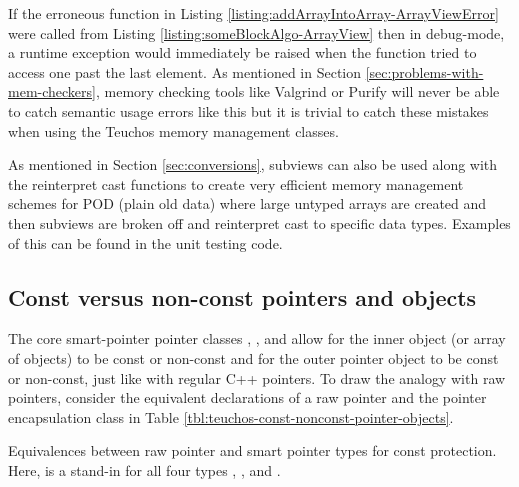 \documentclass[pdf,ps2pdf,11pt]{SANDreport}
\begin{document}
If the erroneous {} function in Listing
{}\ref{listing:addArrayIntoArray-ArrayViewError} were called from
Listing {}\ref{listing:someBlockAlgo-ArrayView} then in debug-mode, a
runtime exception would immediately be raised when the
{} function tried to access one past
the last element.  As mentioned in Section
{}\ref{sec:problems-with-mem-checkers}, memory checking tools like
Valgrind or Purify will never be able to catch semantic usage errors
like this but it is trivial to catch these mistakes when using the
Teuchos memory management classes.

As mentioned in Section {}\ref{sec:conversions}, subviews can also
be used along with the reinterpret cast functions to create very
efficient memory management schemes for POD (plain old data) where
large untyped {} arrays are created and then subviews are
broken off and reinterpret cast to specific data types.  Examples of
this can be found in the unit testing code.


%
{}\subsection{Const versus non-const pointers and objects}
\label{sec:teuchos-const-nonconst-pointer-objects}
%

The core smart-pointer pointer classes {}, {},
{} and {} allow for the inner object (or
array of objects) to be const or non-const and for the outer pointer
object to be const or non-const, just like with regular C++ pointers.
To draw the analogy with raw pointers, consider the equivalent
declarations of a raw pointer and the pointer encapsulation class in
Table {}\ref{tbl:teuchos-const-nonconst-pointer-objects}.

\begin{table}
%
\begin{center}
%
%

%
%
\end{center}
{}\caption[Equivalences between raw pointer and smart pointer types
for const protection]{
\label{tbl:teuchos-const-nonconst-pointer-objects}
Equivalences between raw pointer and smart pointer types for const
protection.  Here, {} is a stand-in for all four types
{}, {}, {} and {}.}
%
\end{table}
\end{document}
